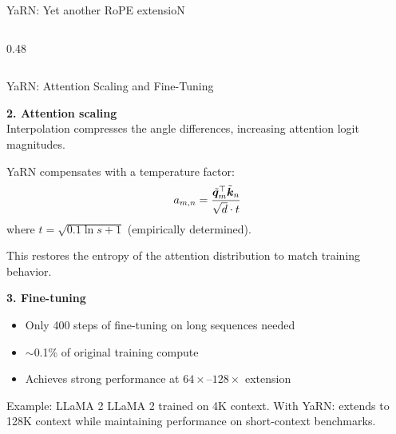 \begin{frame}{YaRN: Yet another RoPE extensioN~\cite{peng2023yarn}}
\begin{columns}[T]
\begin{column}{0.48\textwidth}
    \end{column}
  \end{columns}

\end{frame}

\begin{frame}{YaRN: Attention Scaling and Fine-Tuning}

  \textbf{2. Attention scaling} \\[0.3em]
  Interpolation compresses the angle differences, increasing attention logit magnitudes.

  \vspace{0.3em}
  YaRN compensates with a temperature factor:
  \[
    a_{m,n} = \frac{\tilde{{\boldsymbol{q}}}_m^\top \tilde{{\boldsymbol{k}}}_n}{\sqrt{d} \cdot t}
  \]
  where $t = \sqrt{0.1 \ln s + 1}$ (empirically determined).

  This restores the entropy of the attention distribution to match training behavior.

  \vspace{0.5em}
  \textbf{3. Fine-tuning} \\[0.3em]
  \begin{itemize}
    \item Only 400 steps of fine-tuning on long sequences needed
    \item $\sim$0.1\% of original training compute
    \item Achieves strong performance at $64\times$--$128\times$ extension
  \end{itemize}

  \vspace{0.5em}
  \begin{exampleblock}{Example: LLaMA 2}
    LLaMA 2 trained on 4K context. With YaRN: extends to 128K context
    while maintaining performance on short-context benchmarks.
  \end{exampleblock}

\end{frame}

